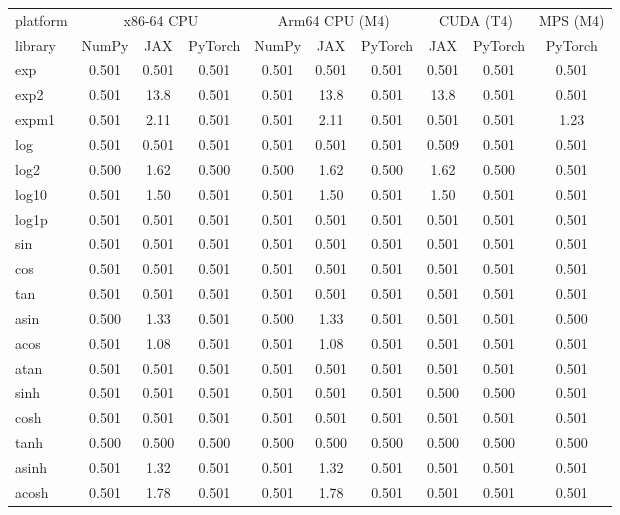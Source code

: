\begin{table}
\centering
\begin{small}
\begin{tabular}{|l|ccc|ccc|cc|c|}
\hline
platform & \multicolumn{3}{c|}{x86-64 CPU} & \multicolumn{3}{c|}{Arm64 CPU (M4)} & \multicolumn{2}{c|}{CUDA (T4)} & \multicolumn{1}{c|}{MPS (M4)} \\
library & NumPy & JAX & PyTorch & NumPy & JAX & PyTorch & JAX & PyTorch & PyTorch \\ \hline
exp & 0.501 & 0.501 & 0.501 & 0.501 & 0.501 & 0.501 & 0.501 & 0.501 & 0.501 \\
exp2 & 0.501 & 13.8 & 0.501 & 0.501 & 13.8 & 0.501 & 13.8 & 0.501 & 0.501 \\
expm1 & 0.501 & 2.11 & 0.501 & 0.501 & 2.11 & 0.501 & 0.501 & 0.501 & 1.23 \\
log & 0.501 & 0.501 & 0.501 & 0.501 & 0.501 & 0.501 & 0.509 & 0.501 & 0.501 \\
log2 & 0.500 & 1.62 & 0.500 & 0.500 & 1.62 & 0.500 & 1.62 & 0.500 & 0.501 \\
log10 & 0.501 & 1.50 & 0.501 & 0.501 & 1.50 & 0.501 & 1.50 & 0.501 & 0.501 \\
log1p & 0.501 & 0.501 & 0.501 & 0.501 & 0.501 & 0.501 & 0.501 & 0.501 & 0.501 \\
sin & 0.501 & 0.501 & 0.501 & 0.501 & 0.501 & 0.501 & 0.501 & 0.501 & 0.501 \\
cos & 0.501 & 0.501 & 0.501 & 0.501 & 0.501 & 0.501 & 0.501 & 0.501 & 0.501 \\
tan & 0.501 & 0.501 & 0.501 & 0.501 & 0.501 & 0.501 & 0.501 & 0.501 & 0.501 \\
asin & 0.500 & 1.33 & 0.501 & 0.500 & 1.33 & 0.501 & 0.501 & 0.501 & 0.500 \\
acos & 0.501 & 1.08 & 0.501 & 0.501 & 1.08 & 0.501 & 0.501 & 0.501 & 0.501 \\
atan & 0.501 & 0.501 & 0.501 & 0.501 & 0.501 & 0.501 & 0.501 & 0.501 & 0.501 \\
sinh & 0.501 & 0.501 & 0.501 & 0.501 & 0.501 & 0.501 & 0.500 & 0.500 & 0.501 \\
cosh & 0.501 & 0.501 & 0.501 & 0.501 & 0.501 & 0.501 & 0.501 & 0.501 & 0.501 \\
tanh & 0.500 & 0.500 & 0.500 & 0.500 & 0.500 & 0.500 & 0.500 & 0.500 & 0.500 \\
asinh & 0.501 & 1.32 & 0.501 & 0.501 & 1.32 & 0.501 & 0.501 & 0.501 & 0.501 \\
acosh & 0.501 & 1.78 & 0.501 & 0.501 & 1.78 & 0.501 & 0.501 & 0.501 & 0.501 \\

\end{tabular}
\end{small}
\end{table}
